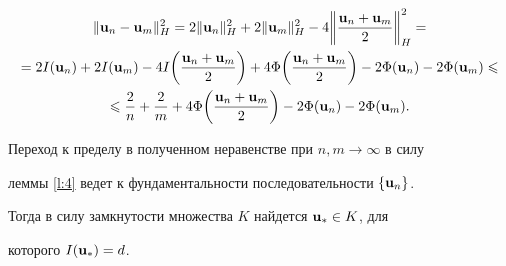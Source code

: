 \begin{multline*}


\|{\bold u}_n - {\bold u}_m\|_H^2=2\|{\bold u}_n\|_H^2+2\|{\bold u}_m\|_H^2-


4\bigg\|\frac{{\bold u}_n+{\bold u}_m}{2}\bigg\|_H^2=\\


=2I({\bold u}_n)+2I({\bold u}_m)-4I\bigg(\frac{{\bold u}_n+


{\bold u}_m}{2}\bigg)


+4\Phi\bigg(\frac{{\bold u}_n+{\bold u}_m}{2}\bigg)-


2\Phi({\bold u_n})-2\Phi({\bold u_m})\leqslant\\


\leqslant\frac{2}{n}+\frac{2}{m}


+4\Phi\bigg(\frac{{\bold u}_n+{\bold u}_m}{2}\bigg)-


2\Phi({\bold u_n})-2\Phi({\bold u_m}).


\end{multline*}


Переход к пределу в полученном неравенстве при $n, m \to \infty$ в силу


леммы \ref{l:4} ведет к фундаментальности последовательности $\{ {\bold u}_n\}$.


Тогда в силу замкнутости множества $K$ найдется ${\bold u_*} \in K$, для


которого $I({\bold u_*})=d$.











